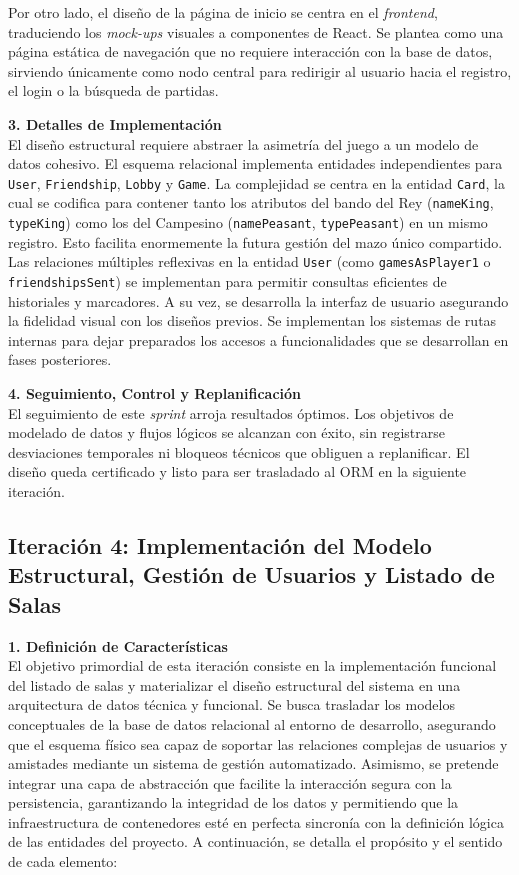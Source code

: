 Por otro lado, el diseño de la página de inicio se centra en el \textit{frontend}, traduciendo los \textit{mock-ups} visuales a componentes de React. Se plantea como una página estática de navegación que no requiere interacción con la base de datos, sirviendo únicamente como nodo central para redirigir al usuario hacia el registro, el login o la búsqueda de partidas.

\textbf{3. Detalles de Implementación} \\
El diseño estructural requiere abstraer la asimetría del juego a un modelo de datos cohesivo. El esquema relacional implementa entidades independientes para \texttt{User}, \texttt{Friendship}, \texttt{Lobby} y \texttt{Game}. La complejidad se centra en la entidad \texttt{Card}, la cual se codifica para contener tanto los atributos del bando del Rey (\texttt{nameKing}, \texttt{typeKing}) como los del Campesino (\texttt{namePeasant}, \texttt{typePeasant}) en un mismo registro. Esto facilita enormemente la futura gestión del mazo único compartido. Las relaciones múltiples reflexivas en la entidad \texttt{User} (como \texttt{gamesAsPlayer1} o \texttt{friendshipsSent}) se implementan para permitir consultas eficientes de historiales y marcadores.
A su vez, se desarrolla la interfaz de usuario asegurando la fidelidad visual con los diseños previos. Se implementan los sistemas de rutas internas para dejar preparados los accesos a funcionalidades que se desarrollan en fases posteriores.

\textbf{4. Seguimiento, Control y Replanificación} \\
El seguimiento de este \textit{sprint} arroja resultados óptimos. Los objetivos de modelado de datos y flujos lógicos se alcanzan con éxito, sin registrarse desviaciones temporales ni bloqueos técnicos que obliguen a replanificar. El diseño queda certificado y listo para ser trasladado al ORM en la siguiente iteración.

\subsection{Iteración 4: Implementación del Modelo Estructural, Gestión de Usuarios y Listado de Salas}

\textbf{1. Definición de Características} \\
El objetivo primordial de esta iteración consiste en la implementación funcional del listado de salas y materializar el diseño estructural del sistema en una arquitectura de datos técnica y funcional. Se busca trasladar los modelos conceptuales de la base de datos relacional al entorno de desarrollo, asegurando que el esquema físico sea capaz de soportar las relaciones complejas de usuarios y amistades mediante un sistema de gestión automatizado. Asimismo, se pretende integrar una capa de abstracción que facilite la interacción segura con la persistencia, garantizando la integridad de los datos y permitiendo que la infraestructura de contenedores esté en perfecta sincronía con la definición lógica de las entidades del proyecto.
A continuación, se detalla el propósito y el sentido de cada elemento:

